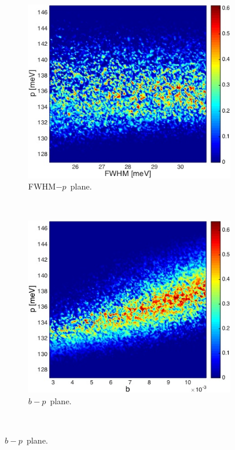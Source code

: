 \documentclass[review]{elsarticle}
\begin{document}
\begin{figure}[ht!]
\begin{subfigure}{0.5\textwidth}
\centering
\includegraphics[width=0.9\linewidth]{NSE15-48R1_Figure11a.jpg}
\caption{FWHM$-p$~plane.}
\end{subfigure}
~
\begin{subfigure}{0.5\textwidth}
\centering
\includegraphics[width=0.9\linewidth]{NSE15-48R1_Figure11b.jpg}
\caption{$b-p$~plane.}
\label{gp23}
\end{subfigure}\\


\end{figure}
\end{document}
